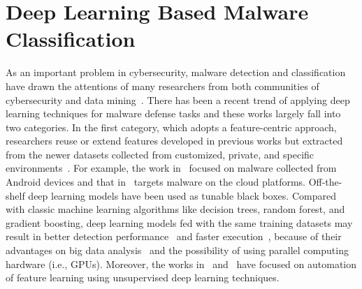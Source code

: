 

\section{Deep Learning Based Malware Classification}

As an important problem in cybersecurity, malware detection and classification have drawn the attentions of many researchers from both communities of cybersecurity and data mining~\cite{MalDetectSurvey1, MalDetectSurvey2}.
There has been a recent trend of applying deep learning techniques for malware defense tasks and these works largely fall into two categories.
In the first category, which adopts a feature-centric approach, researchers reuse or extend features developed in previous works but extracted from the newer datasets collected from customized, private, and specific environments~\cite{EarlyStageRnn, DeepFlow, DeepAM, RandomProjectionNn, AutoEncoderFeatureLearn, AutoEncoderMicrosoft, LstmSyscall, MalwareLstmGru}.
For example, the work in~\cite{DeepFlow} focused on malware collected from Android devices and that in~\cite{DeepAM} targets malware on the cloud platforms.
Off-the-shelf deep learning models have been used as tunable black boxes.
Compared with classic machine learning algorithms like decision trees, random forest, and gradient boosting,
deep learning models fed with the same training datasets may result in better detection performance~\cite{DeepFlow,RandomProjectionNn} and faster execution~\cite{EarlyStageRnn},
because of their advantages on big data analysis~\cite{RandomProjectionNn} and the possibility of using parallel computing hardware (i.e., GPUs).
Moreover, the works in~\cite{AutoEncoderFeatureLearn} and~\cite{AutoEncoderMicrosoft} have focused on automation of feature learning using unsupervised deep learning techniques.


